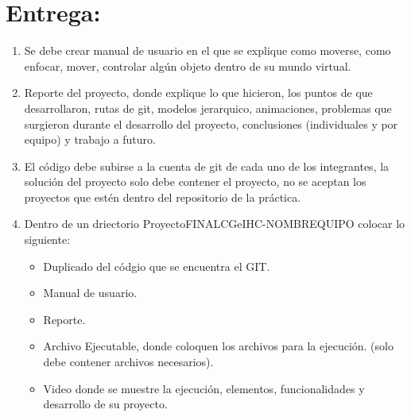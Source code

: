 \documentclass[12pt,letterpaper]{article}
\begin{document}
\section*{Entrega:}
\begin{enumerate}
\item Se debe crear manual de usuario en el que se explique como moverse, como enfocar, mover, controlar algún objeto dentro de su mundo virtual.
\item Reporte del proyecto, donde explique lo que hicieron, los puntos de que desarrollaron, rutas de git, modelos jerarquico, animaciones, problemas que surgieron durante el desarrollo del proyecto, conclusiones (individuales y por equipo) y trabajo a futuro.
\item El código debe subirse a la cuenta de git de cada uno de los integrantes, la solución del proyecto solo debe contener el proyecto, no se aceptan los proyectos que estén dentro del repositorio de la práctica.
\item Dentro de un driectorio ProyectoFINALCGeIHC-NOMBREQUIPO colocar lo siguiente:
\begin{itemize}
\item Duplicado del códgio que se encuentra el GIT.
\item Manual de usuario.
\item Reporte.
\item Archivo Ejecutable, donde coloquen los archivos para la ejecución. (solo debe contener archivos necesarios).
\item Video donde se muestre la ejecución, elementos, funcionalidades y desarrollo de su proyecto.
\end{itemize}
\end{enumerate}
\end{document}
